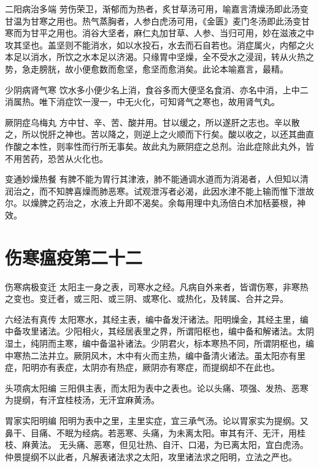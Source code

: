 \documentclass[a4paper,12pt,UTF8,twoside]{ctexbook}
\begin{document}
    二阳病治多端
    劳伤荣卫，渐郁而为热者，炙甘草汤可用，喻嘉言清燥汤即此汤变甘温为甘寒之用也。热气蒸胸者，人参白虎汤可用，《金匮》麦门冬汤即此汤变甘寒而为甘平之用也。消谷大坚者，麻仁丸加甘草、人参、当归可用，妙在滋液之中攻其坚也。盖坚则不能消水，如以水投石，水去而石自若也。消症属火，内郁之火本足以消水，所饮之水本足以济渴。只缘胃中坚燥，全不受水之浸润，转从火热之势，急走膀胱，故小便愈数而愈坚，愈坚而愈消矣。此论本喻嘉言，最精。
    
    少阴病肾气寒
    饮水多小便少名上消，食谷多而大便坚名食消、亦名中消，上中二消属热。唯下消症饮一溲一，中无火化，可知肾气之寒也，故用肾气丸。
    
    厥阴症乌梅丸
    方中甘、辛、苦、酸并用。甘以缓之，所以遂肝之志也。辛以散之，所以悦肝之神也。苦以降之，则逆上之火顺而下行矣。酸以收之，以还其曲直作酸之本性，则率性而行所无事矣。故此丸为厥阴症之总剂。治此症除此丸外，皆不用苦药，恐苦从火化也。
    
    变通妙燥热餐
    有脾不能为胃行其津液，肺不能通调水道而为消渴者，人但知以清润治之，而不知脾喜燥而肺恶寒。试观泄泻者必渴，此因水津不能上输而惟下泄故尔。以燥脾之药治之，水液上升即不渴矣。余每用理中丸汤倍白术加栝蒌根，神效。
    
    
    
    \section{伤寒瘟疫第二十二}
   	
    
    伤寒病极变迁
    太阳主一身之表，司寒水之经。凡病自外来者，皆谓伤寒，非寒热之变也。变迁者，或三阳、或三阴、或寒化、或热化，及转属、合并之异。
    
    六经法有真传
    太阳寒水，其经主表，编中备发汗诸法。阳明燥金，其经主里，编中备攻里诸法。少阳相火，其经居表里之界，所谓阳枢也，编中备和解诸法。太阴湿土，纯阴而主寒，编中备温补诸法。少阴君火，标本寒热不同，所谓阴枢也，编中寒热二法并立。厥阴风木，木中有火而主热，编中备清火诸法。虽太阳亦有里症，阳明亦有表症，太阴亦有热症，厥阴亦有寒症，而提纲却不在此也。
    
    头项病太阳编
    三阳俱主表，而太阳为表中之表也。论以头痛、项强、发热、恶寒为提纲，有汗宜桂枝汤，无汗宜麻黄汤。
    
    胃家实阳明编
    阳明为表中之里，主里实症，宜三承气汤。论以胃家实为提纲。又鼻干、目痛、不眠为经病。若恶寒、头痛，为未离太阳。审其有汗、无汗，用桂枝、麻黄法。
    无头痛、恶寒，但见壮热、自汗、口渴，为已离太阳，宜白虎汤。仲景提纲不以此者，凡解表诸法求之太阳，攻里诸法求之阳明，立法之严也。
    
\end{document}
